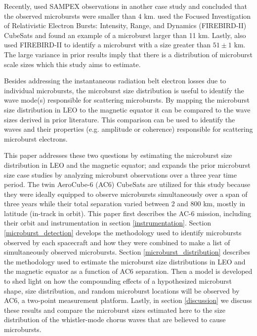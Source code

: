 \documentclass[draft]{agujournal2019}
\begin{document}
Recently,  used SAMPEX observations in another case study and concluded that the observed microbursts were smaller than $4$ km.  used the Focused Investigation of Relativistic Electron Bursts: Intensity, Range, and Dynamics (FIREBIRD-II) CubeSats and found an example of a microburst larger than 11 km. Lastly,  also used FIREBIRD-II to identify a microburst with a size greater than $ 51 \pm 1$ km. The large variance in prior results imply that there is a distribution of microburst scale sizes which this study aims to estimate.

Besides addressing the instantaneous radiation belt electron losses due to individual microbursts, the microburst size distribution is useful to identify the wave mode(s) responsible for scattering microbursts. By mapping the microburst size distribution in LEO to the magnetic equator it can be compared to the wave sizes derived in prior literature. This comparison can be used to identify the waves and their properties (e.g. amplitude or coherence) responsible for scattering microburst electrons.

This paper addresses these two questions by estimating the microburst size distribution in LEO and the magnetic equator; and expands the prior microburst size case studies by analyzing microburst observations over a three year time period. The twin AeroCube-6 (AC6) CubeSats are utilized for this study because they were ideally equipped to observe microbursts simultaneously over a span of three years while their total separation varied between 2 and 800 km, mostly in latitude (in-track in orbit). This paper first describes the AC-6 mission, including their orbit and instrumentation in section \ref{instrumentation}. Section \ref{microburst_detection} develops the methodology used to identify microbursts observed by each spacecraft and how they were combined to make a list of simultaneously observed microbursts. Section \ref{microburst_distribution} describes the methodology used to estimate the microburst size distributions in LEO and the magnetic equator as a function of AC6 separation. Then a model is developed to shed light on how the compounding effects of a hypothesized microburst shape, size distribution, and random microburst locations will be observed by AC6, a two-point measurement platform. Lastly, in section \ref{discussion} we discuss these results and compare the microburst sizes estimated here to the size distribution of the whistler-mode chorus waves that are believed to cause microbursts. 
\end{document}
